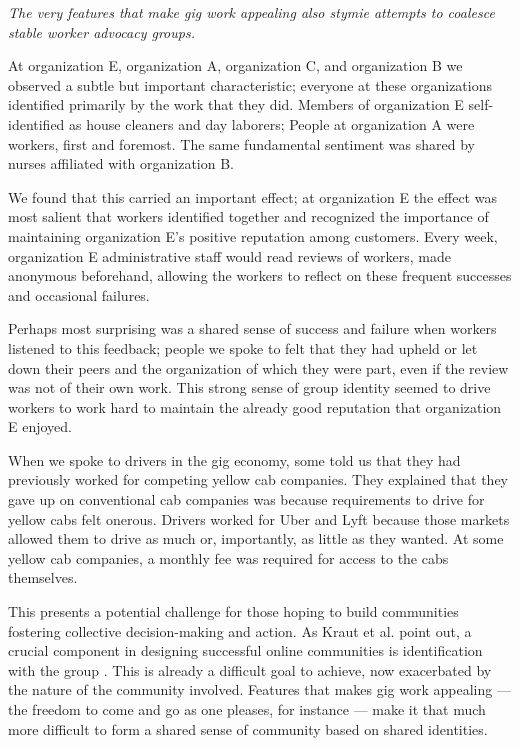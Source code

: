 \textit{The very features that make gig work appealing also stymie attempts to coalesce stable worker advocacy groups.}

At organization E, organization A, organization C, and organization B we observed a subtle but important characteristic;
everyone at these organizations identified primarily by the work that they did.
Members of organization E self-identified as house cleaners and day laborers;
People at organization A were workers, first and foremost.
The same fundamental sentiment was shared by nurses affiliated with organization B.

We found that this carried an important effect;
at organization E the effect was most salient that workers identified together and recognized the importance of maintaining organization E's positive reputation among customers.
Every week, organization E administrative staff would read reviews of workers,
made anonymous beforehand,
allowing the workers to reflect on these frequent successes and occasional failures.

Perhaps most surprising was a shared sense of success and failure when workers listened to this feedback;
people we spoke to felt that they had upheld or let down their peers and the organization of which they were part,
even if the review was not of their own work.
This strong sense of group identity seemed to drive workers to work hard to maintain the already good reputation that organization E enjoyed.

When we spoke to drivers in the gig economy, some told us that they had previously worked for competing yellow cab companies.
They explained that they gave up on conventional cab companies was because requirements to drive for yellow cabs felt onerous.
Drivers worked for Uber and Lyft because those markets allowed them to drive as much or, importantly, as little as they wanted.
At some yellow cab companies, a monthly fee was required for access to the cabs themselves.

This presents a potential challenge for those hoping to build communities fostering collective decision-making and action.
As Kraut et al. point out, a crucial component in designing successful online communities is identification with the group
\cite{successfulOnlineCommunities}.
This is already a difficult goal to achieve, now exacerbated by the nature of the community involved.
Features that makes gig work appealing
--- the freedom to come and go as one pleases, for instance ---
make it that much more difficult to form a shared sense of community based on shared identities.

